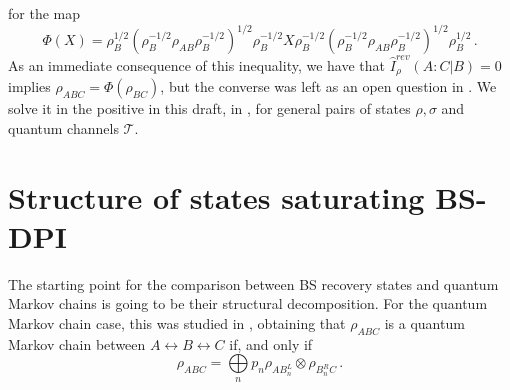 \documentclass[11pt]{article}
\theoremstyle{newdefinition}
\theoremstyle{newplain}
\theoremstyle{myplain}
\DeclareMathOperator{\1}{\mathds{1}}
\begin{document}
for the map
\begin{equation}\label{MapPhi}
    \Phi(X) = \rho_B^{1/2}(\rho_B^{-1/2}\rho_{AB}\rho_B^{-1/2})^{1/2}\rho_B^{-1/2}X\rho_B^{-1/2}(\rho_B^{-1/2}\rho_{AB}\rho_B^{-1/2})^{1/2}\rho_B^{1/2} \, . 
\end{equation}
As an immediate consequence of this inequality, we have that $ \widehat{I}^{rev}_{\rho}(A:C | B) = 0$ implies $\rho_{ABC}= \Phi(\rho_{BC}) $, but the converse was left as an open question in \cite{gondolf2024conditional}. We solve it in the positive in this draft, in , for general pairs of states $\rho, \sigma$ and quantum channels $\mathcal{T}$. 



\section{Structure of states saturating BS-DPI}

The starting point for the comparison between BS recovery states and quantum Markov chains is going to be their structural decomposition. For the quantum Markov chain case, this was studied in \cite{HaydenJozsaPetzWinter-StrongSubadditivity-2004}, obtaining that $\rho_{ABC}$ is a quantum Markov chain between $A \leftrightarrow B \leftrightarrow C $ if, and only if
\begin{equation}
    \rho_{ABC} = \underset{n }{\bigoplus} p_n \rho_{AB_n^L} \otimes  \rho_{B_n^R C} \, .
\end{equation}

\end{document}
